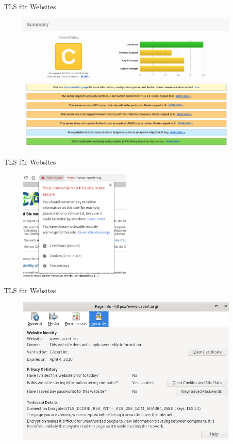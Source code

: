\documentclass[10pt]{beamer}
\begin{document}
\begin{frame}[fragile]{TLS für Websites}
\begin{figure}
	\includegraphics[width=1\textwidth]{images/not-secure1}
\end{figure}
\end{frame}

\begin{frame}[fragile]{TLS für Websites}
\begin{figure}
\includegraphics[width=0.5\textwidth]{images/not-secure2}
\end{figure}
\end{frame}

\begin{frame}[fragile]{TLS für Websites}
\begin{figure}
\includegraphics[width=1\textwidth]{images/not-secure3}
\end{figure}
\end{frame}
\end{document}

